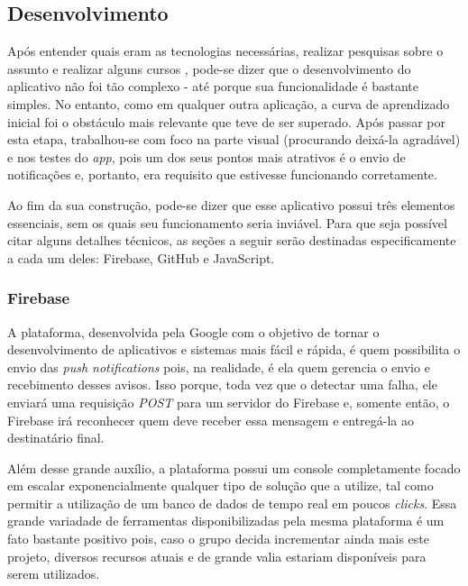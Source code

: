 \subsection{Desenvolvimento}
\label{subsec:desenvolvimento}

Após entender quais eram as tecnologias necessárias, realizar pesquisas sobre o assunto e realizar alguns cursos \online{}, pode-se dizer que o desenvolvimento do aplicativo não foi tão complexo - até porque sua funcionalidade é bastante simples. No entanto, como em qualquer outra aplicação, a curva de aprendizado inicial foi o obstáculo mais relevante que teve de ser superado. Após passar por esta etapa, trabalhou-se com foco na parte visual (procurando deixá-la agradável) e nos testes do \textit{app}, pois um dos seus pontos mais atrativos é o envio de notificações e, portanto, era requisito que estivesse funcionando corretamente. 

Ao fim da sua construção, pode-se dizer que esse aplicativo possui três elementos essenciais, sem os quais seu funcionamento seria inviável. Para que seja possível citar alguns detalhes técnicos, as seções a seguir serão destinadas especificamente a cada um deles: Firebase, GitHub e JavaScript.

\subsubsection{Firebase}
\label{subsubsec:firebase}

A plataforma, desenvolvida pela Google com o objetivo de tornar o desenvolvimento de aplicativos e sistemas mais fácil e rápida, é quem possibilita o envio das \textit{push notifications} pois, na realidade, é ela quem gerencia o envio e recebimento desses avisos. Isso porque, toda vez que o \adaptive{} detectar uma falha, ele enviará uma requisição \textit{POST} para um servidor do Firebase e, somente então, o Firebase irá reconhecer quem deve receber essa mensagem e entregá-la ao destinatário final.

Além desse grande auxílio, a plataforma possui um console completamente focado em escalar exponencialmente qualquer tipo de solução que a utilize, tal como permitir a utilização de um banco de dados de tempo real em poucos \textit{clicks}. Essa grande variadade de ferramentas disponibilizadas pela mesma plataforma é um fato bastante positivo pois, caso o grupo decida incrementar ainda mais este projeto, diversos recursos atuais e de grande valia estariam disponíveis para serem utilizados.


